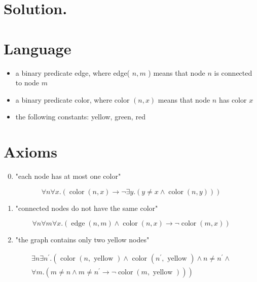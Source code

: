\documentclass[10pt]{article}
\begin{document}
\section{Solution.}
\section{Language}
\begin{itemize}
  \item a binary predicate edge, where edge( $n, m$ ) means that node $n$ is connected to node $m$
  \item a binary predicate color, where color $(n, x)$ means that node $n$ has color $x$
  \item the following constants: yellow, green, red
\end{itemize}

\section{Axioms}
\begin{enumerate}
  \setcounter{enumi}{-1}
  \item "each node has at most one color"
\end{enumerate}

$$
\forall n \forall x .(\operatorname{color}(n, x) \rightarrow \neg \exists y .(y \neq x \wedge \operatorname{color}(n, y)))
$$

\begin{enumerate}
  \item "connected nodes do not have the same color"
\end{enumerate}

$$
\forall n \forall m \forall x .(\operatorname{edge}(n, m) \wedge \operatorname{color}(n, x) \rightarrow \neg \operatorname{color}(m, x))
$$

\begin{enumerate}
  \setcounter{enumi}{1}
  \item "the graph contains only two yellow nodes"
\end{enumerate}

$$
\begin{array}{r}
\exists n \exists n^{\prime} .\left(\text { color }(n, \text { yellow }) \wedge \text { color }\left(n^{\prime}, \text { yellow }\right) \wedge n \neq n^{\prime} \wedge\right. \\
\left.\forall m .\left(m \neq n \wedge m \neq n^{\prime} \rightarrow \neg \operatorname{color}(m, \text { yellow })\right)\right)
\end{array}
$$
\end{document}
